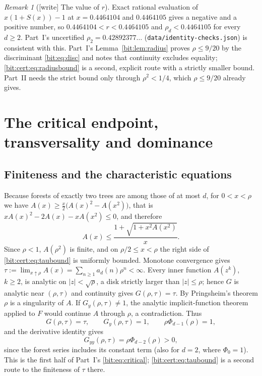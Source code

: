 \documentclass[11pt]{article}
\theoremstyle{definition}\newtheorem{definition}[theorem]{Definition}
\theoremstyle{remark}\newtheorem{remark}[theorem]{Remark}
\begin{document}
\begin{remark}[\textsf{[write]} The value of $r$]\label{bit:cert:rem:r}
Exact rational evaluation of $x(1+S(x))-1$ at $x=0.4464104$ and $0.4464105$
gives a negative and a positive number, so
$0.4464104<r<0.4464105$ and $\rho_d<0.4464105$ for every $d\ge2$. Part~I's
uncertified $\rho_2=0.42892377\ldots$ (\texttt{data/identity-checks.json})
is consistent with this. Part~I's Lemma~\ref{bit:lem:radius} proves
$\rho\le9/20$ by the discriminant \eqref{bit:eq:disc} and notes that
continuity excludes equality; \eqref{bit:cert:eq:radiusbound} is a second,
explicit route with a strictly smaller bound. Part~II needs the strict bound
only through $\rho^2<1/4$, which $\rho\le9/20$ already gives.
\end{remark}

\section{The critical endpoint, transversality and dominance}\label{bit:cert:sec:critical}
\subsection{Finiteness and the characteristic equations}
Because forests of exactly two trees are among those of at most $d$, for
$0<x<\rho$ we have $A(x)\ge\frac x2\bigl(A(x)^2-A(x^2)\bigr)$, that is
$xA(x)^2-2A(x)-xA(x^2)\le0$, and therefore
\begin{equation}\label{bit:cert:eq:taubound}
 A(x)\le\frac{1+\sqrt{1+x^2A(x^2)}}x.
\end{equation}
Since $\rho<1$, $A(\rho^2)$ is finite, and on $\rho/2\le x<\rho$ the right side
of \eqref{bit:cert:eq:taubound} is uniformly bounded. Monotone convergence
gives $\tau:=\lim_{x\uparrow\rho}A(x)=\sum_{n\ge1}a_d(n)\rho^n<\infty$. Every
inner function $A(z^k)$, $k\ge2$, is analytic on $|z|<\sqrt\rho$, a disk
strictly larger than $|z|\le\rho$; hence $G$ is analytic near $(\rho,\tau)$ and
continuity gives $G(\rho,\tau)=\tau$. By Pringsheim's theorem $\rho$ is a
singularity of $A$. If $G_y(\rho,\tau)\ne1$, the analytic implicit-function
theorem applied to $F$ would continue $A$ through $\rho$, a contradiction.
Thus
\begin{equation}\label{bit:cert:eq:critical}
 G(\rho,\tau)=\tau,\qquad G_y(\rho,\tau)=1,
 \qquad \rho\Phi_{d-1}(\rho)=1,
\end{equation}
and the derivative identity gives
\begin{equation}\label{bit:cert:eq:Gyy}
 G_{yy}(\rho,\tau)=\rho\Phi_{d-2}(\rho)>0,
\end{equation}
since the forest series includes its constant term (also for $d=2$, where
$\Phi_0=1$). This is the first half of Part~I's \eqref{bit:eq:critical};
\eqref{bit:cert:eq:taubound} is a second route to the finiteness of $\tau$
there.
\end{document}
